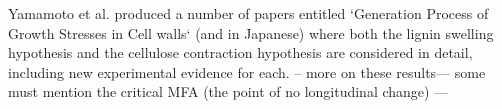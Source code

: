 Yamamoto et al. produced a number of papers entitled `Generation Process of
Growth Stresses in Cell walls` \cite{ISI:A1991FD97000001}\cite{ISI:A1992HP18200001}\cite{ISI:A1993LM28800002}\cite{ISI:A1993LE99600003}\cite{ISI:A1995QJ03000001} (and \cite{ISI:A1988R357800002}\cite{ISI:A1990EL71100002} in Japanese) where both the lignin swelling
hypothesis and the cellulose contraction hypothesis are considered in detail,
including new experimental evidence for each. -- more on these results--- some
must mention the critical MFA (the point of no longitudinal change) ---